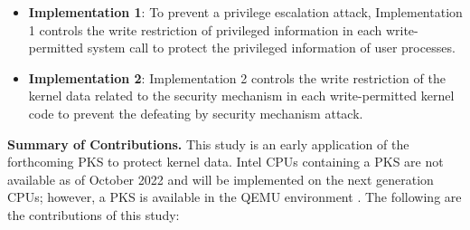 \begin{itemize}%


\item {\bf Implementation 1}: To prevent a privilege escalation attack,
Implementation 1 controls the write restriction of privileged information in each
write-permitted system call to protect the privileged information of user processes.

\item {\bf Implementation 2}: 
Implementation 2 controls the write restriction of the kernel data related to
the security mechanism in each write-permitted kernel code to prevent the
defeating by security mechanism attack.


\end{itemize}


%
{\bf Summary of Contributions.}
This study is an early application of the forthcoming PKS to protect kernel
data.
%
Intel CPUs containing a PKS are not available as of October 2022 and will be
implemented on the next generation CPUs; however, a PKS is available in the QEMU
environment \cite{qemu}.
%
%
The following are the contributions of this study:
%
%
% 

%

